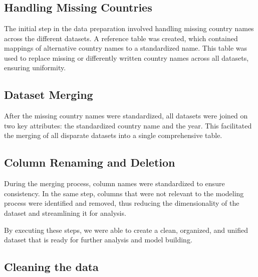     \section{\dsIntegratedDataset}

        \subsection{Handling Missing Countries}

            The initial step in the data preparation involved handling missing country names across the different datasets. A reference table was created, which contained mappings of alternative country names to a standardized name. This table was used to replace missing or differently written country names across all datasets, ensuring uniformity.

        \subsection{Dataset Merging}

            After the missing country names were standardized, all datasets were joined on two key attributes: the standardized country name and the year. This facilitated the merging of all disparate datasets into a single comprehensive table.

        \subsection{Column Renaming and Deletion}

            During the merging process, column names were standardized to ensure consistency. In the same step, columns that were not relevant to the modeling process were identified and removed, thus reducing the dimensionality of the dataset and streamlining it for analysis.

            By executing these steps, we were able to create a clean, organized, and unified dataset that is ready for further analysis and model building.

        \subsection{Cleaning the data}

